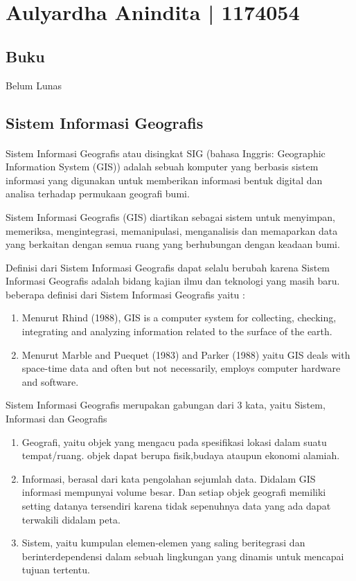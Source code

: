 \section{Aulyardha Anindita | 1174054}
\subsection{Buku}
Belum Lunas
\subsection{Sistem Informasi Geografis}
\paragraph{}
Sistem Informasi Geografis atau disingkat SIG (bahasa Inggris: Geographic Information System (GIS)) adalah sebuah komputer yang berbasis sistem informasi yang digunakan untuk memberikan informasi bentuk digital dan analisa terhadap permukaan geografi bumi.

Sistem Informasi Geografis (GIS) diartikan sebagai sistem untuk menyimpan, memeriksa, mengintegrasi, memanipulasi, menganalisis dan memaparkan data yang berkaitan dengan semua ruang yang berhubungan dengan keadaan bumi.

Definisi dari Sistem Informasi Geografis dapat selalu berubah karena Sistem Informasi Geografis adalah bidang kajian ilmu dan teknologi yang masih baru. beberapa definisi dari Sistem Informasi Geografis yaitu :
\begin{enumerate}
\item Menurut Rhind (1988), GIS is a computer system for collecting, checking, integrating and analyzing information related to the surface of the earth.
\item Menurut Marble and Puequet (1983) and Parker (1988) yaitu GIS deals with space-time data and often but not necessarily, employs computer hardware and software.
\end{enumerate}

Sistem Informasi Geografis merupakan gabungan dari 3 kata, yaitu Sistem, Informasi dan Geografis
\begin{enumerate}
\item Geografi, yaitu objek yang mengacu pada spesifikasi lokasi dalam suatu tempat/ruang. objek dapat berupa fisik,budaya ataupun ekonomi alamiah.
\item Informasi, berasal dari kata pengolahan sejumlah data. Didalam GIS informasi mempunyai volume besar. Dan setiap objek geografi memiliki setting datanya tersendiri karena tidak sepenuhnya data yang ada dapat terwakili didalam peta.
\item Sistem, yaitu kumpulan elemen-elemen yang saling beritegrasi dan berinterdependensi dalam sebuah lingkungan yang dinamis untuk mencapai tujuan tertentu.
\end{enumerate}

